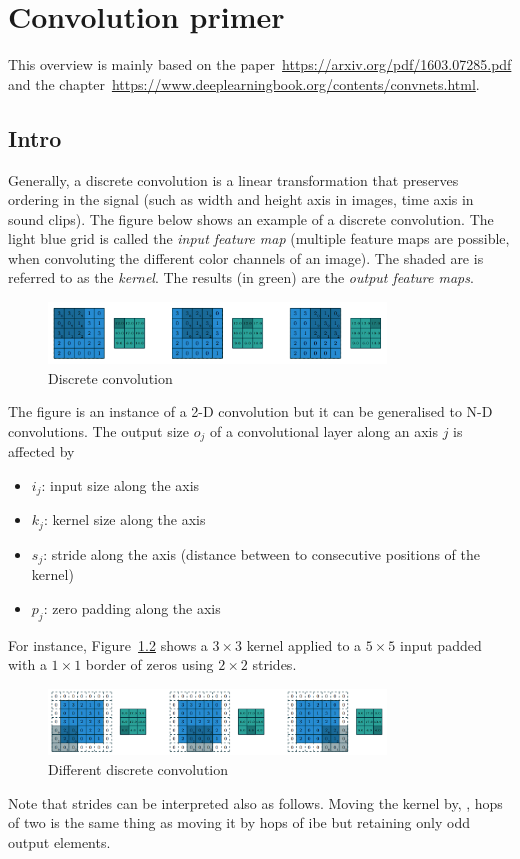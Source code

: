\chapter{Convolution primer}\label{chap:appendix:conv}
This overview is mainly based on the
paper~\url{https://arxiv.org/pdf/1603.07285.pdf} and the
chapter~\url{https://www.deeplearningbook.org/contents/convnets.html}.

\section{Intro}
Generally, a discrete convolution is a linear transformation that
preserves ordering in the signal (such as width and height axis in
images, time axis in sound clips). The figure below shows an example
of a discrete convolution. The light blue grid is called the
\emph{input feature map} (multiple feature maps are possible, \eg when
convoluting the different color channels of an image). The shaded are
is referred to as the \emph{kernel}. The results (in green) are the
\emph{output feature maps}.

\begin{figure}[htpb]
  \centering
  \includegraphics[width=0.8\textwidth]{Figures/discrete_convolution_example}
  \caption{Discrete convolution}%
  \label{fig:conv:ex1}
\end{figure}

The figure is an instance of a 2-D convolution but it can be
generalised to N-D convolutions. The output size $o_j$ of a
convolutional layer along an axis $j$ is affected by
\begin{itemize}
\item $i_j$: input size along the axis
\item $k_j$: kernel size along the axis
\item $s_j$: stride along the axis (distance between to consecutive
  positions of the kernel)
\item $p_j$: zero padding along the axis
\end{itemize}
For instance, Figure~\ref{fig:conv:ex2} shows a $3\times 3$ kernel
applied to a $5 \times 5$ input padded with a $1 \times 1$ border of
zeros using $2 \times 2$ strides.
\begin{figure}[htpb]
  \centering
  \includegraphics[width=0.8\textwidth]{Figures/discrete_convolution_example2}
  \caption{Different discrete convolution}%
  \label{fig:conv:ex2}
\end{figure}
Note that strides can be interpreted also as follows. Moving the
kernel by, \eg, hops of two is the same thing as moving it by hops of
ibe but retaining only odd output elements.

